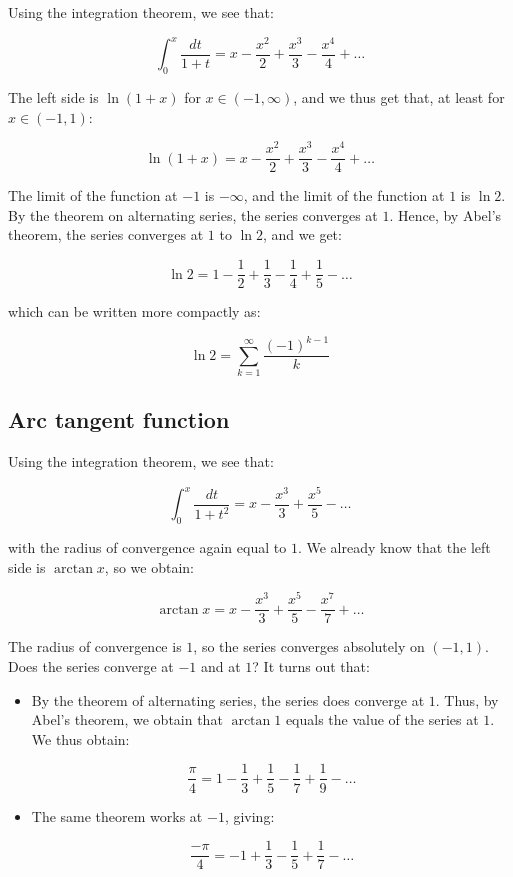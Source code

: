\documentclass{amsart}
\begin{document}
Using the integration theorem, we see that:

$$\int_0^x \frac{dt}{1 + t} = x - \frac{x^2}{2} + \frac{x^3}{3} - \frac{x^4}{4} + \dots$$

The left side is $\ln(1 + x)$ for $x \in (-1,\infty)$, and we thus get
that, at least for $x \in (-1,1)$:

$$\ln(1 + x) =  x - \frac{x^2}{2} + \frac{x^3}{3} - \frac{x^4}{4}
 + \dots$$

The limit of the function at $-1$ is $-\infty$, and the limit of the
function at $1$ is $\ln 2$. By the theorem on alternating series, the
series converges at $1$. Hence, by Abel's theorem, the series
converges at $1$ to $\ln 2$, and we get:

$$\ln 2 = 1 - \frac{1}{2} + \frac{1}{3} - \frac{1}{4} + \frac{1}{5} - \dots$$

which can be written more compactly as:

$$\ln 2 = \sum_{k=1}^\infty \frac{(-1)^{k-1}}{k}$$
\subsection{Arc tangent function}

Using the integration theorem, we see that:

$$\int_0^x \frac{dt}{1 + t^2} = x - \frac{x^3}{3} + \frac{x^5}{5} - \dots$$

with the radius of convergence again equal to $1$. We already know
that the left side is $\arctan x$, so we obtain:

$$\arctan x = x - \frac{x^3}{3} + \frac{x^5}{5} - \frac{x^7}{7} + \dots$$

The radius of convergence is $1$, so the series converges absolutely
on $(-1,1)$. Does the series converge at $-1$ and at $1$? It turns out
that:

\begin{itemize}
\item By the theorem of alternating series, the series does converge
  at $1$. Thus, by Abel's theorem, we obtain that $\arctan 1$ equals
  the value of the series at $1$. We thus obtain:

  $$\frac{\pi}{4} = 1 - \frac{1}{3} + \frac{1}{5} - \frac{1}{7} + \frac{1}{9} - \dots$$

\item The same theorem works at $-1$, giving:

  $$\frac{-\pi}{4} = -1 + \frac{1}{3} - \frac{1}{5} + \frac{1}{7} - \dots$$

\end{itemize}
\end{document}
